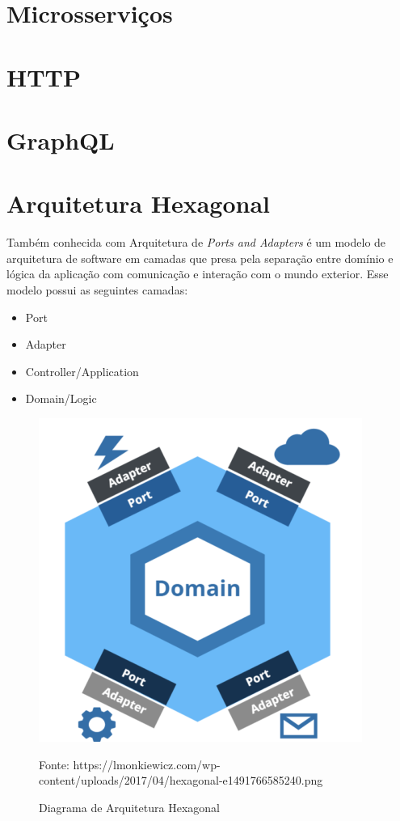 \documentclass[]{politex}
\newcommand{\legend}[1]{\begin{center}\def\caption{}\caption{#1}\end{center}}
\begin{document}
	\section{Microsserviços}
	
	\section{HTTP}
	
	\section{GraphQL}
	
	\section{Arquitetura Hexagonal}
	
	Também conhecida com Arquitetura de \textit{Ports and Adapters} é um modelo de arquitetura de software em camadas que presa pela separação entre domínio e lógica da aplicação com comunicação e interação com o mundo exterior. Esse modelo possui as seguintes camadas:
	
	\begin{itemize}
	    \item Port
	    \item Adapter
	    \item Controller/Application
	    \item Domain/Logic
	\end{itemize}
	
	\begin{figure}[htb]
	    \caption{Diagrama de Arquitetura Hexagonal}
	    \begin{center}
	        \includegraphics[scale=0.6]{hexagonal1.png}
	    \end{center}
	    \label{fig:hexagonal1}
	    \legend{Fonte: https://lmonkiewicz.com/wp-content/uploads/2017/04/hexagonal-e1491766585240.png}
	\end{figure}
\end{document}
